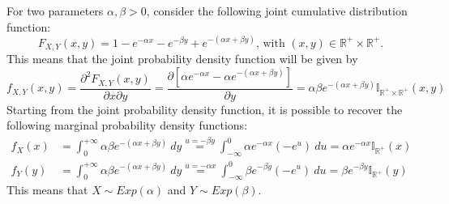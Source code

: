 \documentclass{report}
\begin{document}
\begin{examplebox}
    For two parameters $\alpha, \beta > 0$, consider the following joint cumulative distribution function:
    \[F_{X, Y}(x, y) = 1 - e^{-\alpha x} - e^{-\beta y} + e^{-(\alpha x + \beta y)} \text{, with $(x, y) \in \mathbb{R}^+ \times \mathbb{R}^+$.}\]
    This means that the joint probability density function will be given by
    \[f_{X, Y}(x, y) = \frac{\partial^2F_{X, Y}(x, y)}{\partial x \partial y} = \frac{\partial[\alpha e^{-\alpha x} - \alpha e^{-(\alpha x + \beta y)}]}{\partial y} = \alpha\beta e^{-(\alpha x + \beta y)}\mathbb{I}_{\mathbb{R}^+ \times \mathbb{R}^+}(x, y)\]
    Starting from the joint probability density function, it is possible to recover the following marginal probability density functions:
    \begin{align*}
        f_X(x) &= \int_0^{+\infty} \alpha\beta e^{-(\alpha x + \beta y)} \ dy \stackrel{u = -\beta y}{=} \int_{-\infty}^0 \alpha e^{-\alpha x}(-e^u) \ du = \alpha e^{-\alpha x}\mathbb{I}_{\mathbb{R}^+}(x) \\
        f_Y(y) &= \int_0^{+\infty} \alpha\beta e^{-(\alpha x + \beta y)} \ dy \stackrel{u = -\alpha x}{=} \int_{-\infty}^0 \beta e^{-\beta y}(-e^u) \ du = \beta e^{-\beta y}\mathbb{I}_{\mathbb{R}^+}(y)
    \end{align*}
    This means that $\displaystyle X \sim Exp(\alpha)$ and $\displaystyle Y \sim Exp(\beta)$.
\end{examplebox}
\end{document}
